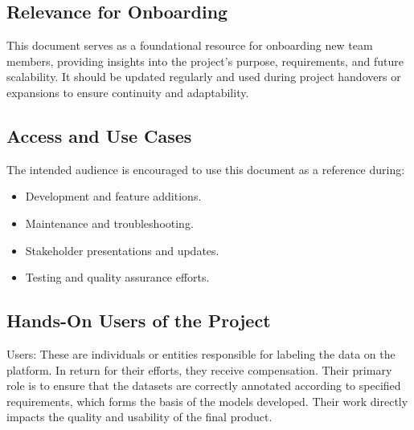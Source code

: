 \documentclass{article}
\begin{document}
\subsection{Relevance for Onboarding}
This document serves as a foundational resource for onboarding new team members, providing insights into the project’s purpose, requirements, and future scalability. It should be updated regularly and used during project handovers or expansions to ensure continuity and adaptability.

\subsection{Access and Use Cases}
The intended audience is encouraged to use this document as a reference during:
\begin{itemize}
    \item Development and feature additions.
    \item Maintenance and troubleshooting.
    \item Stakeholder presentations and updates.
    \item Testing and quality assurance efforts.
\end{itemize}


\subsection{Hands-On Users of the Project}
Users: These are individuals or entities responsible for labeling the data on the platform. In return for their efforts, they receive compensation. Their primary role is to ensure that the datasets are correctly annotated according to specified requirements, which forms the basis of the models developed. Their work directly impacts the quality and usability of the final product.

\newpage
\end{document}

